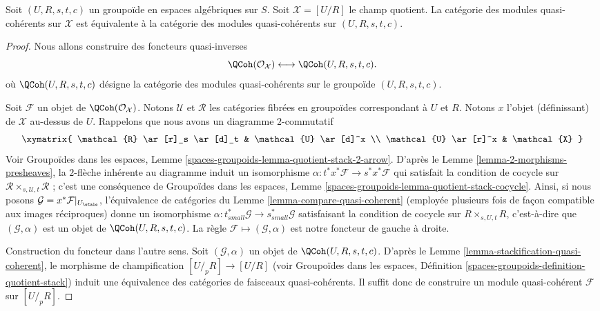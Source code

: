\begin{proposition}
\label{proposition-quasi-coherent}
Soit $(U, R, s, t, c)$ un groupoïde en espaces algébriques sur $S$.
Soit $\mathcal{X} = [U/R]$ le champ quotient.
La catégorie des modules quasi-cohérents sur $\mathcal{X}$
est équivalente à la catégorie des modules quasi-cohérents
sur $(U, R, s, t, c)$.
\end{proposition}

\begin{proof}
Nous allons construire des foncteurs quasi-inverses
$$
\QCoh(\mathcal{O}_\mathcal{X})
\longleftrightarrow
\QCoh(U, R, s, t, c).
$$
où $\QCoh(U, R, s, t, c)$ désigne la catégorie des modules quasi-cohérents
sur le groupoïde $(U, R, s, t, c)$.

\medskip\noindent
Soit $\mathcal{F}$ un objet de $\QCoh(\mathcal{O}_\mathcal{X})$.
Notons $\mathcal{U}$ et $\mathcal{R}$ les catégories fibrées en groupoïdes
correspondant à $U$ et $R$. Notons $x$ l'objet (définissant) de $\mathcal{X}$
au-dessus de $U$. Rappelons que nous avons un diagramme $2$-commutatif
$$
\xymatrix{
\mathcal{R} \ar[r]_s \ar[d]_t & \mathcal{U} \ar[d]^x \\
\mathcal{U} \ar[r]^x & \mathcal{X}
}
$$
Voir Groupoïdes dans les espaces, Lemme
\ref{spaces-groupoids-lemma-quotient-stack-2-arrow}.
D'après le Lemme \ref{lemma-2-morphisms-presheaves},
la $2$-flèche inhérente au diagramme induit un isomorphisme
$\alpha : t^*x^*\mathcal{F} \to s^*x^*\mathcal{F}$
qui satisfait la condition de cocycle sur
$\mathcal{R} \times_{s, \mathcal{U}, t} \mathcal{R}$ ;
c'est une conséquence de Groupoïdes dans les espaces, Lemme
\ref{spaces-groupoids-lemma-quotient-stack-cocycle}.
Ainsi, si nous posons $\mathcal{G} = x^*\mathcal{F}|_{U_\etale}$,
l'équivalence de catégories du
Lemme \ref{lemma-compare-quasi-coherent}
(employée plusieurs fois de façon compatible aux images réciproques)
donne un isomorphisme
$\alpha : t_{small}^*\mathcal{G} \to s_{small}^*\mathcal{G}$
satisfaisant la condition de cocycle sur $R \times_{s, U, t} R$, c'est-à-dire que
$(\mathcal{G}, \alpha)$ est un objet de $\QCoh(U, R, s, t, c)$.
La règle $\mathcal{F} \mapsto (\mathcal{G}, \alpha)$ est notre
foncteur de gauche à droite.

\medskip\noindent
Construction du foncteur dans l'autre sens.
Soit $(\mathcal{G}, \alpha)$ un objet de $\QCoh(U, R, s, t, c)$.
D'après le Lemme \ref{lemma-stackification-quasi-coherent},
le morphisme de champification $[U/_{\!p}R] \to [U/R]$ (voir
Groupoïdes dans les espaces, Définition
\ref{spaces-groupoids-definition-quotient-stack})
induit une équivalence des catégories de faisceaux quasi-cohérents.
Il suffit donc de construire un module quasi-cohérent $\mathcal{F}$
sur $[U/_{\!p}R]$.


\end{proof}
